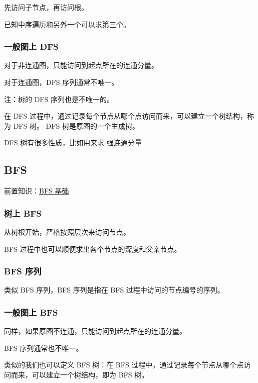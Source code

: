 先访问子节点，再访问根。

已知中序遍历和另外一个可以求第三个。

\subsubsection{一般图上 DFS}

对于非连通图，只能访问到起点所在的连通分量。

对于连通图，DFS 序列通常不唯一。

注：树的 DFS 序列也是不唯一的。

在 DFS 过程中，通过记录每个节点从哪个点访问而来，可以建立一个树结构，称为 DFS 树。 DFS 树是原图的一个生成树。

DFS 树有很多性质，比如用来求 \href{/graph/scc}{强连通分量}

\subsection{BFS}

前置知识：\href{/search/bfs}{BFS 基础}

\subsubsection{树上 BFS}

从树根开始，严格按照层次来访问节点。

BFS 过程中也可以顺便求出各个节点的深度和父亲节点。

\subsubsection{BFS 序列}

类似 BFS 序列，BFS 序列是指在 BFS 过程中访问的节点编号的序列。

\subsubsection{一般图上 BFS}

同样，如果原图不连通，只能访问到起点所在的连通分量。

BFS 序列通常也不唯一。

类似的我们也可以定义 BFS 树：在 BFS 过程中，通过记录每个节点从哪个点访问而来，可以建立一个树结构，即为 BFS 树。

